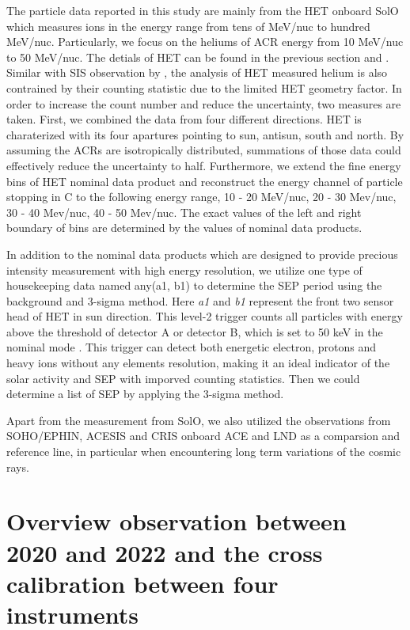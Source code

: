 The particle data reported in this study are mainly from the \acl{HET} onboard \ac{SolO} which measures ions in the energy range from tens of MeV/nuc to hundred MeV/nuc. Particularly, we focus on the heliums of \ac{ACR} energy from 10 MeV/nuc to 50 MeV/nuc. The detials of \ac{HET} can be found in the previous section and \citet{RodriguezPacheco-2019-EPD}.
Similar with \ac{SIS} observation by \citet{Mason-2021-SolOQuietTime}, the analysis of \ac{HET} measured helium is also contrained by their counting statistic due to the limited \ac{HET} geometry factor. In order to increase the count number and reduce the uncertainty, two measures are taken. First, we combined the data from four different directions. \ac{HET} is charaterized with its four apartures pointing to sun, antisun, south and north. By assuming the \acp{ACR} are isotropically distributed, summations of those data could effectively reduce the uncertainty to half. Furthermore, we extend the fine energy bins of \ac{HET} nominal data product and reconstruct the energy channel of particle stopping in C to the following energy range, 10 - 20 MeV/nuc, 20 - 30 Mev/nuc, 30 - 40 Mev/nuc, 40 - 50 Mev/nuc. The exact values of the left and right boundary of bins are determined by the values of nominal data products.

In addition to the nominal data products which are designed to provide precious intensity measurement with high energy resolution, we utilize one type of housekeeping data named any(a1, b1) to determine the \ac{SEP} period using the background and 3-sigma method. Here \textit{a1} and \textit{b1} represent the front two sensor head of \ac{HET} in sun direction. This level-2 trigger counts all  particles with energy above the threshold of detector A or detector B, which is set to 50 keV in the nominal mode \citep{Elftmann-2020-PhD}. This trigger can detect both energetic electron, protons and heavy ions without any elements resolution, making it an ideal indicator of the solar activity and \ac{SEP} with imporved counting statistics. Then we could determine a list of \ac{SEP} by applying the 3-sigma method.

Apart from the measurement from \ac{SolO}, we also utilized the observations from \ac{SOHO}/\ac{EPHIN}, \ac{ACESIS} and \ac{CRIS} onboard \ac{ACE} and \ac{LND} as a comparsion and reference line, in particular when encountering long term variations of the cosmic rays.


\section{Overview observation between 2020 and 2022 and the cross calibration between four instruments}

